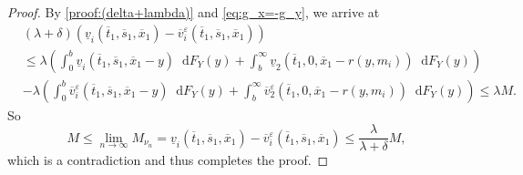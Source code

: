 \documentclass[10pt,a4paper]{amsart}
\newcommand*\diff{\mathop{}\!\mathrm{d}}
\begin{document}
\begin{proof}
By \eqref{proof:(delta+lambda)} and \eqref{eq:g_x=-g_y}, we arrive at
   \begin{align*}
         &(\lambda + \delta)(\underline{v}_i(\overline{t}_1,\overline{s}_1,\overline{x}_1)-\overline{v}^\varepsilon_i(\overline{t}_1,\overline{s}_1,\overline{x}_1)) \nonumber\\
        &\leq \lambda \left(\int_{0}^{b}\underline{v}_i(\overline{t}_1,\overline{s}_1,\overline{x}_1-y)\diff F_Y(y)  
   +\int_{b}^{\infty}\underline{v}_2(\overline{t}_1,0,\overline{x}_1-r(y,m_i))\diff F_Y(y)\right) \nonumber\\
   &-  \lambda \left(\int_{0}^{b}\overline{v}^\varepsilon_i(\overline{t}_1,\overline{s}_1,\overline{x}_1-y)\diff F_Y(y)  
    +\int_{b}^{\infty}\overline{v}^\varepsilon_2(\overline{t}_1,0,\overline{x}_1-r(y,m_i))\diff F_Y(y)\right) \leq \lambda M.
    \end{align*}
    So 
    \begin{equation*}
       M \leq \lim_{n \to \infty}M_{\nu_n} =\underline{v}_i(\overline{t}_1,\overline{s}_1,\overline{x}_1)-\overline{v}^\varepsilon_i(\overline{t}_1,\overline{s}_1,\overline{x}_1)\leq \frac{\lambda}{\lambda + \delta} M,
    \end{equation*}
    which is a contradiction and thus completes the proof.

\end{proof}
\end{document}
